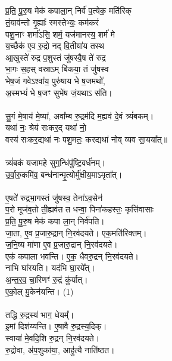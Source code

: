 \subsection{}
प्र॒ति॒ पू॒रु॒ष मेक॑ कपाला॒न् निर्व॑ प॒त्येक॒ मति॑रिक् \\
तं॒याव॑न्तो गृ॒ह्याः᳚ स्मस्तेभ्यः॒ कम॑करं\\
पशू॒नाꣳ शर्मा॑ऽसि॒ शर्म॒ यज॑मानस्य॒ शर्म॑ मे \\
य॒च्छैक॑ ए॒व रु॒द्रो नद् वि॒तीया॑य तस्थ \\
आ॒खुस्ते॑ रुद्र प॒शुस्तं जु॑षस्वै॒ष ते॑ रुद्र \\
भा॒गः स॒हस् वस्राऽम् बि॑कया॒ तं जु॑षस्व\\
भेष॒जं गवेऽश्वा॑य॒ पुरु॑षाय भे ष॒जमथो॑, \\
अ॒स्मभ्यं॑ भे ष॒जꣳ सुभे॑ष जं॒यथाऽ स॑ति।\\
\\
सु॒गं मे॒षाय॑ मे॒ष्या॑, अवा᳚म्ब रु॒द्रम॑दि म॒ह्यव॑ दे॒वं त्र्यं॑बकम्।\\
यथा॑ नः॒ श्रेय॑ सःकर॒द् यथा॑ नो॒\\
वस्य॑ सःकर॒द्यथा॑ नः पशु॒मतः॒ करद्यथा॑ नोव् व्यव सा॒यया᳚त्॥\\
\\
त्र्यं॑बकं यजामहे सुग॒न्धिंपु॑ष्टि॒वर्ध॑नम्। \\
उ॒र्वा॒रु॒कमि॑व॒ बन्ध॑नान्मृ॒त्योर्मु॑क्षीय॒माऽमृता᳚त्।\\
\\
ए॒षते॑ रुद्रभा॒गस्तं जु॑षस्व॒ तेना॑ऽव॒सेन॑\\
प॒रो मूज॑व॒तो ती॒ह्यव॑त त धन्वा॒ पिना॑कहस्तः॒ कृत्ति॑वासाः \\
प्र॒ति॒ पू॒रु॒ष मेक॑ कपा ला॒न् निर्व॑पति।\\
जा॒ता, ए॒व प्र॒जारु॒द्रान् नि॒रव॑दयते। एक॒मति॑रिक्तम्।\\
ज॒नि॒ष्य मा॑णा ए॒व प्र॒जारु॒द्रान् नि॒रव॑दयते। \\
एक॑ कपाला भवन्ति। ए॒क॒ धैवरु॒द्रन् नि॒रव॑दयते।\\
नाभि घा॑रयति। यद॑भि घा॒रये᳚त्‌। \\
अ॒न्त॒र॒व॒ चा॒रिणꣳ॑ रु॒द्रं कु॑र्यात्। \\
ए॒को॒ल् मु॒केन॑यन्ति। (1)\\
\\
तद्धि रु॒द्रस्य॑ भाग॒ धेयम्᳚। \\
इ॒मां दिश॑य्यन्ति। ए॒षावै रु॒द्रस्य॒दिक्।\\
स्वाया॑ मे॒वदि॒शि रु॒द्रन् नि॒रव॑दयते। \\
रु॒द्रोवा, अ॑प॒शुका॑या॒, आहु॑त्यै नाति॑ष्ठत।\\
